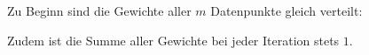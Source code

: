 Zu Beginn sind die Gewichte aller $m$ Datenpunkte gleich verteilt:

Zudem ist die Summe aller Gewichte bei jeder Iteration stets $1$.

